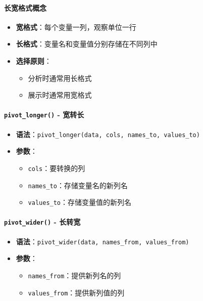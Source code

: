 \documentclass[
  twoside]{book}
\providecommand{\tightlist}{%
  \setlength{\itemsep}{0pt}\setlength{\parskip}{0pt}}
\begin{document}
\hypertarget{ux957fux5bbdux683cux5f0fux6982ux5ff5}{%
\paragraph{长宽格式概念}\label{ux957fux5bbdux683cux5f0fux6982ux5ff5}}

\begin{itemize}
\tightlist
\item
  \textbf{宽格式}：每个变量一列，观察单位一行
\item
  \textbf{长格式}：变量名和变量值分别存储在不同列中
\item
  \textbf{选择原则}：

  \begin{itemize}
  \tightlist
  \item
    分析时通常用长格式
  \item
    展示时通常用宽格式
  \end{itemize}
\end{itemize}

\hypertarget{pivot_longer---ux5bbdux8f6cux957f}{%
\paragraph{\texorpdfstring{\texttt{pivot\_longer()} - 宽转长}{pivot\_longer() - 宽转长}}\label{pivot_longer---ux5bbdux8f6cux957f}}

\begin{itemize}
\tightlist
\item
  \textbf{语法}：\texttt{pivot\_longer(data,\ cols,\ names\_to,\ values\_to)}
\item
  \textbf{参数}：

  \begin{itemize}
  \tightlist
  \item
    \texttt{cols}：要转换的列
  \item
    \texttt{names\_to}：存储变量名的新列名
  \item
    \texttt{values\_to}：存储变量值的新列名
  \end{itemize}
\end{itemize}

\hypertarget{pivot_wider---ux957fux8f6cux5bbd}{%
\paragraph{\texorpdfstring{\texttt{pivot\_wider()} - 长转宽}{pivot\_wider() - 长转宽}}\label{pivot_wider---ux957fux8f6cux5bbd}}

\begin{itemize}
\tightlist
\item
  \textbf{语法}：\texttt{pivot\_wider(data,\ names\_from,\ values\_from)}
\item
  \textbf{参数}：

  \begin{itemize}
  \tightlist
  \item
    \texttt{names\_from}：提供新列名的列
  \item
    \texttt{values\_from}：提供新列值的列
  \end{itemize}
\end{itemize}
\end{document}
